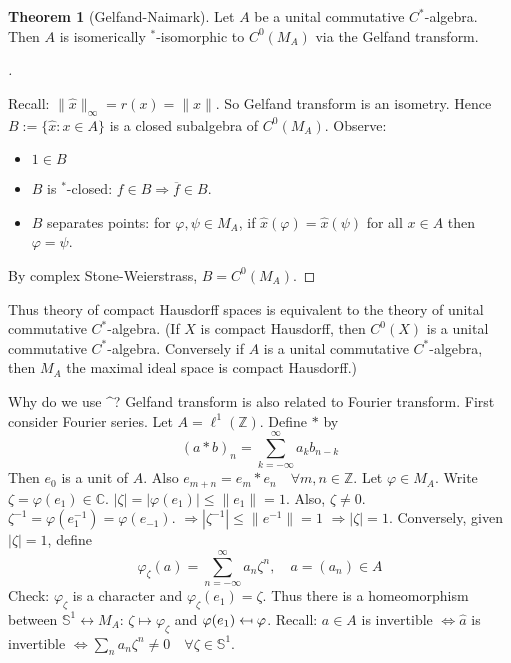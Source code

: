 \documentclass{article}
\theoremstyle{definition}
\newtheorem{thm}{Theorem}
\newenvironment{proofs}[1][\proofname]{%
  \begin{proof}[#1]$ $\par\nobreak\ignorespaces
}{%
  \end{proof}
}
\newcommand{\CC}{\mathbb C}
\renewcommand{\SS}{\mathbb S}
\newcommand{\ZZ}{\mathbb Z}
\newcommand{\Ra}{\Rightarrow}
\newcommand{\Lra}{\Leftrightarrow}
\newcommand{\lra}{\leftrightarrow}
\begin{document}
\begin{thm}[Gelfand-Naimark]
	Let $A$ be a unital commutative $C^*$-algebra.
	Then $A$ is isomerically $^*$-isomorphic to $C^0(M_A)$ via the Gelfand transform.
\end{thm}

\begin{proofs}
	Recall: $\|\widehat{x}\|_\infty = r(x) = \|x\|$.
	So Gelfand transform is an isometry.
	Hence $B := \{\widehat{x}: x \in A\}$ is a closed subalgebra of $C^0(M_A)$.
	Observe:
	\begin{itemize}
		\item $1 \in B$

		\item $B$ is $^*$-closed: $f \in B \Ra \overline{f} \in B$.

		\item $B$ separates points: for $\varphi, \psi \in M_A$, if $\widehat{x}(\varphi) = \widehat{x}(\psi)$ for all $x \in A$ then $\varphi = \psi$.
	\end{itemize}
	By complex Stone-Weierstrass, $B = C^0(M_A)$.
\end{proofs}

Thus theory of compact Hausdorff spaces is equivalent to the theory of unital commutative $C^*$-algebra.
(If $X$ is compact Hausdorff, then $C^0(X)$ is a unital commutative $C^*$-algebra.
Conversely if $A$ is a unital commutative $C^*$-algebra, then $M_A$ the maximal ideal space is compact Hausdorff.)	

\par Why do we use $\^$?
Gelfand transform is also related to Fourier transform.
First consider Fourier series.
Let $A = \ell^1(\ZZ)$.
Define $*$ by 
\[
	(a * b)_n = \sum_{k = -\infty}^\infty a_k b_{n - k}
\]
Then $e_0$ is a unit of $A$.
Also $e_{m + n} = e_m * e_n \quad \forall m, n \in \ZZ$.
Let $\varphi \in M_A$.
Write $\zeta = \varphi(e_1) \in \CC$.
$|\zeta| = |\varphi(e_1)| \leq \|e_1\| = 1$.
Also, $\zeta \neq 0$.
$\zeta^{-1} = \varphi(e_1^{-1}) = \varphi(e_{-1})$.
$\Ra |\zeta^{-1}| \leq \|e^{-1}\| = 1$
$\Ra |\zeta| = 1$.
Conversely, given $|\zeta| = 1$, define
\[
	\varphi_\zeta(a) = \sum_{n = -\infty}^\infty a_n \zeta^n, \quad a = (a_n) \in A
\]
Check: $\varphi_\zeta$ is a character and $\varphi_\zeta(e_1) = \zeta$.
Thus there is a homeomorphism between $\SS^1 \lra M_A$: $\zeta \mapsto \varphi_\zeta$ and $\varphi(e_1) \mathrel{\reflectbox{\ensuremath{\mapsto}}} \varphi$.
Recall: $a \in A$ is invertible $\Lra \widehat{a}$ is invertible $\Lra \sum_n a_n \zeta^n \neq 0 \quad \forall \zeta \in \SS^1$.
\end{document}

